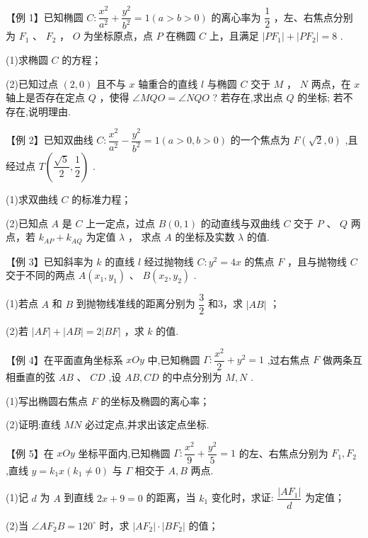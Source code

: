 【例 1】已知椭圆 $C : \dfrac{{x}^{2}}{{a}^{2}} + \dfrac{{y}^{2}}{{b}^{2}} = 1\left( {a > b > 0}\right)$ 的离心率为 $\dfrac{1}{2}$ ，左、右焦点分别为 ${F}_{1}$ 、 ${F}_{2}$ ， $O$ 为坐标原点，点 $P$ 在椭圆 $C$ 上，且满足 $\left| {P{F}_{1}}\right|  + \left| {P{F}_{2}}\right|  = 8$ .

(1)求椭圆 $C$ 的方程；

(2)已知过点 $\left( {2,0}\right)$ 且不与 $x$ 轴重合的直线 $l$ 与椭圆 $C$ 交于 $M$ ， $N$ 两点，在 $x$ 轴上是否存在定点 $Q$ ，使得 $\angle {MQO} = \angle {NQO}$ ? 若存在,求出点 $Q$ 的坐标; 若不存在,说明理由.

【例 2】已知双曲线 $C : \dfrac{{x}^{2}}{{a}^{2}} - \dfrac{{y}^{2}}{{b}^{2}} = 1\left( {a > 0,b > 0}\right)$ 的一个焦点为 $F\left( {\sqrt{2},0}\right)$ ,且经过点 $T\left( {\dfrac{\sqrt{5}}{2},\dfrac{1}{2}}\right)$ .

(1)求双曲线 $C$ 的标准力程；

(2)已知点 $A$ 是 $C$ 上一定点，过点 $B\left( {0,1}\right)$ 的动直线与双曲线 $C$ 交于 $P$ 、 $Q$ 两点，若 ${k}_{AP} + {k}_{AQ}$ 为定值 $\lambda$ ， 求点 $A$ 的坐标及实数 $\lambda$ 的值.

【例 3】已知斜率为 $k$ 的直线 $l$ 经过抛物线 $C : {y}^{2} = {4x}$ 的焦点 $F$ ，且与抛物线 $C$ 交于不同的两点 $A\left( {{x}_{1},{y}_{1}}\right)$ 、 $B\left( {{x}_{2},{y}_{2}}\right)$ .

(1)若点 $A$ 和 $B$ 到抛物线准线的距离分别为 $\dfrac{3}{2}$ 和3，求 $\left| {AB}\right|$ ；

(2)若 $\left| {AF}\right|  + \left| {AB}\right|  = 2\left| {BF}\right|$ ，求 $k$ 的值.

【例 4】在平面直角坐标系 ${xOy}$ 中,已知椭圆 $\Gamma  : \dfrac{{x}^{2}}{2} + {y}^{2} = 1$ ,过右焦点 $F$ 做两条互相垂直的弦 ${AB}$ 、 ${CD}$ ,设 ${AB},{CD}$ 的中点分别为 $M,N$ .

(1)写出椭圆右焦点 $F$ 的坐标及椭圆的离心率；

(2)证明:直线 ${MN}$ 必过定点,并求出该定点坐标.

【例 5】在 ${xOy}$ 坐标平面内,已知椭圆 $\Gamma  : \dfrac{{x}^{2}}{9} + \dfrac{{y}^{2}}{5} = 1$ 的左、右焦点分别为 ${F}_{1},{F}_{2}$ ,直线 $y = {k}_{1}x\left( {{k}_{1} \neq  0}\right)$ 与 $\Gamma$ 相交于 $A,B$ 两点.

(1)记 $d$ 为 $A$ 到直线 ${2x} + 9 = 0$ 的距离，当 ${k}_{1}$ 变化时，求证: $\dfrac{\left| A{F}_{1}\right| }{d}$ 为定值；

(2)当 $\angle {A{F}_{2}B} = {120}^{ \circ  }$ 时，求 $\left| {A{F}_{2}}\right|  \cdot  \left| {B{F}_{2}}\right|$ 的值；

